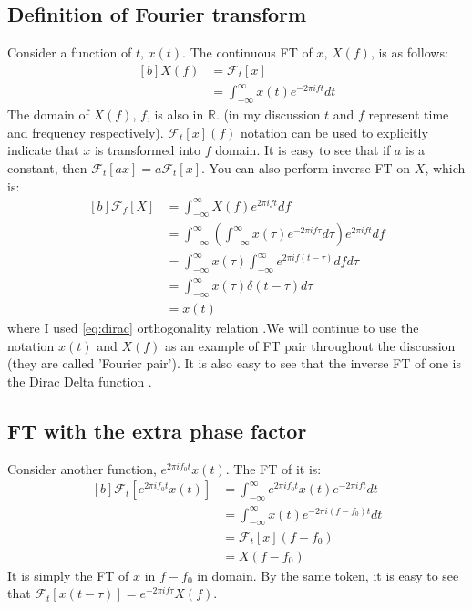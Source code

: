 \documentclass[letterpaper, 11pt]{article}
\newcommand{\fint}{\int_{-\infty}^{\infty}} %
\newcommand{\fourier}[2]{\mathcal{F}_{#1}[#2]} %
\newcommand{\ft}[3]{\fint #2 e^{-2\pi i#3#1} d#1} %
\newcommand{\ift}[3]{\fint #2 e^{2\pi i#1#3} d#1} %
\numberwithin{equation}{section}
\numberwithin{figure}{section}
\numberwithin{table}{section}
\begin{document}
\subsection{Definition of Fourier transform}
Consider a function of \(t\), \(x(t)\). The continuous FT of \(x\), \(X(f)\), is as follows:
\begin{equation}
	\begin{aligned}[b]
		X(f)	&=\fourier{t}{x} \\
			&=\ft{t}{x(t)}{f}
	\end{aligned}
\end{equation}
The domain of \(X(f)\), \(f\), is also in \(\mathbb{R}\). (in my discussion \(t\) and \(f\) represent time and frequency respectively). \(\fourier{t}{x}(f)\) notation can be used to explicitly indicate that \(x\) is transformed into \(f\) domain. It is easy to see that if \(a\) is a constant, then \(\fourier{t}{ax} = a \fourier{t}{x}\). You can also perform inverse FT on \(X\), which is:
\begin{equation}
	\begin{aligned}[b]
		\fourier{f}{X}	&= \ift{f}{X(f)}{t} \\
				&= \ift{f}{\left ( \ft{\tau}{x(\tau)}{f}\right )}{t} \\
				&= \fint x(\tau) \fint e^{2\pi if(t - \tau)} df d\tau \\
				&= \fint x(\tau) \delta (t - \tau) d\tau \\
				&= x(t)
	\end{aligned}
\end{equation}
where I used \eqref{eq:dirac} orthogonality relation .We will continue to use the notation \(x(t)\) and \(X(f)\) as an example of FT pair throughout the discussion (they are called 'Fourier pair'). It is also easy to see that the inverse FT of one is the Dirac Delta function \cite{james}.

\subsection{FT with the extra phase factor}
Consider another function, \(e^{2\pi i f_{0} t}x(t)\). The FT of it is:
\begin{equation}
	\begin{aligned}[b]
		\fourier{t}{e^{2\pi i f_{0} t}x(t)}
			&= \ft{t}{e^{2\pi i f_{0} t}x(t)}{f}\\
			&= \ft{t}{x(t)}{(f - f_{0})}\\
			&= \fourier{t}{x}(f - f_{0})\\
			&= X(f - f_{0})
	\end{aligned}
\end{equation}
It is simply the FT of \(x\) in \(f - f_{0}\) in domain. By the same token, it is easy to see that \(\fourier{t}{x(t - \tau)} = e^{-2\pi i f\tau}X(f)\).
\end{document}
